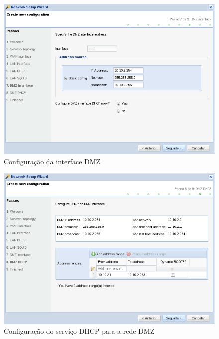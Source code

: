 \begin{figure}[H]
    \begin{center}
    \includegraphics[scale=0.38]{screenshots/etfw/etfw_wizard_07.png}
    \caption{Configuração da interface DMZ}
    \label{fig:etfw_wizard_passo7}
    \end{center}
\end{figure}

\begin{figure}[H]
    \begin{center}
    \includegraphics[scale=0.38]{screenshots/etfw/etfw_wizard_08.png}
    \caption{Configuração do serviço DHCP para a rede DMZ}
    \label{fig:etfw_wizard_passo8}
    \end{center}
\end{figure}


